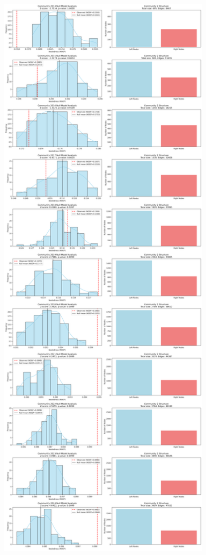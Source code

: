 \begin{figure}[htbp]
\centering
\includegraphics[width=1\textwidth]{../figures/us/significant_periods_community_2.png}

\end{figure}
